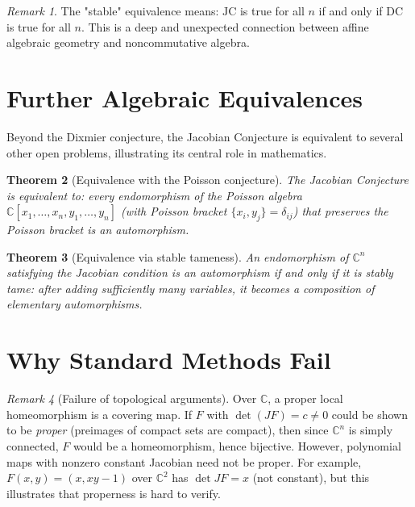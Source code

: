 \documentclass[12pt,a4paper]{amsart}
\newtheorem{theorem}{Theorem}[section]
\theoremstyle{definition}
\theoremstyle{remark}
\newtheorem{remark}[theorem]{Remark}
\begin{document}
\begin{remark}
The "stable" equivalence means: $\mathrm{JC}$ is true for all $n$ if and only if
$\mathrm{DC}$ is true for all $n$. This is a deep and unexpected connection between
affine algebraic geometry and noncommutative algebra.
\end{remark}

\section{Further Algebraic Equivalences}
\label{sec:equiv}

Beyond the Dixmier conjecture, the Jacobian Conjecture is equivalent to several
other open problems, illustrating its central role in mathematics.

\begin{theorem}[Equivalence with the Poisson conjecture]\label{thm:poisson}
The Jacobian Conjecture is equivalent to: every endomorphism of the Poisson algebra
$\mathbb{C}[x_1,\ldots,x_n, y_1,\ldots,y_n]$ (with Poisson bracket
$\{x_i, y_j\} = \delta_{ij}$) that preserves the Poisson bracket is an automorphism.
\end{theorem}

\begin{theorem}[Equivalence via stable tameness]\label{thm:stable}
An endomorphism of $\mathbb{C}^n$ satisfying the Jacobian condition is
an automorphism if and only if it is \emph{stably tame}: after adding sufficiently
many variables, it becomes a composition of elementary automorphisms.
\end{theorem}

\section{Why Standard Methods Fail}
\label{sec:fail}

\begin{remark}[Failure of topological arguments]
Over $\mathbb{C}$, a proper local homeomorphism is a covering map. If $F$ with
$\det(JF) = c \neq 0$ could be shown to be \emph{proper} (preimages of compact
sets are compact), then since $\mathbb{C}^n$ is simply connected, $F$ would be
a homeomorphism, hence bijective. However, polynomial maps with nonzero constant
Jacobian need not be proper. For example, $F(x,y) = (x, xy - 1)$ over $\mathbb{C}^2$
has $\det JF = x$ (not constant), but this illustrates that properness is hard to verify.
\end{remark}
\end{document}
